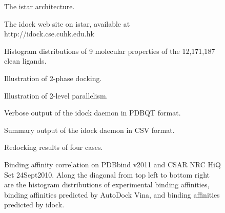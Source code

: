\documentclass[12pt]{article}
\begin{document}

\clearpage



\iffalse

\clearpage

\begin{figure}
\caption{\label{architecture} The istar architecture.}
\end{figure}

\begin{figure}
\caption{\label{idock} The idock web site on istar, available at http://idock.cse.cuhk.edu.hk}
\end{figure}

\begin{figure}
\caption{\label{LigandProperties} Histogram distributions of 9 molecular properties of the 12,171,187 clean ligands.}
\end{figure}

\begin{figure}
\caption{\label{2PhaseDocking} Illustration of 2-phase docking.}
\end{figure}

\begin{figure}
\caption{\label{2LevelParallelism} Illustration of 2-level parallelism.}
\end{figure}

\begin{figure}
\caption{\label{OutputPDBQT} Verbose output of the idock daemon in PDBQT format.}
\end{figure}

\begin{figure}
\caption{\label{OutputCSV} Summary output of the idock daemon in CSV format.}
\end{figure}

\begin{figure}
\caption{\label{Redocking} Redocking results of four cases.}
\end{figure}

\begin{figure}
\caption{\label{FECorrelation} Binding affinity correlation on PDBbind v2011 and CSAR NRC HiQ Set 24Sept2010. Along the diagonal from top left to bottom right are the histogram distributions of experimental binding affinities, binding affinities predicted by AutoDock Vina, and binding affinities predicted by idock.}
\end{figure}
\end{document}
